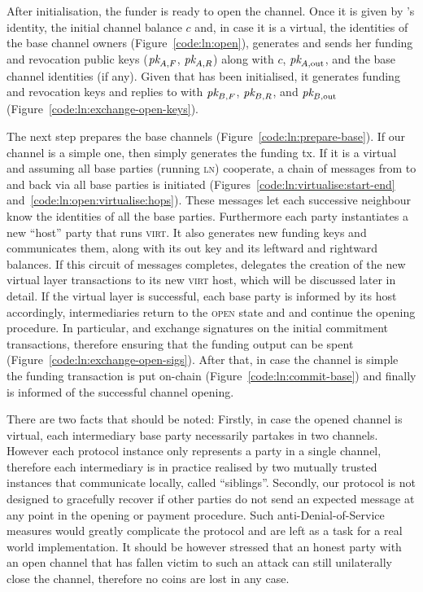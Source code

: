   After initialisation, the funder \alice is ready to open the channel. Once it
  is given by \environment \bob's identity, the initial channel balance $c$ and,
  in case it is a virtual, the identities of the base channel owners
  (Figure~\ref{code:ln:open}), \alice generates and sends \bob her funding and
  revocation public keys ($\textit{pk}_{A, F}$, $\textit{pk}_{A, R}$) along with $c$, $\textit{pk}_{A,
  \mathrm{out}}$, and the base channel identities (if any). Given that \bob has
  been initialised, it generates funding and revocation keys and replies to
  \alice with $\textit{pk}_{B, F}$, $\textit{pk}_{B, R}$, and $\textit{pk}_{B, \mathrm{out}}$
  (Figure~\ref{code:ln:exchange-open-keys}).

  The next step prepares the base channels (Figure~\ref{code:ln:prepare-base}).
  If our channel is a simple one, then \alice simply generates the funding tx.
  If it is a virtual and assuming all base parties (running \textsc{ln})
  cooperate, a chain of messages from \alice to \bob and back via all base
  parties is initiated (Figures~\ref{code:ln:virtualise:start-end}
  and~\ref{code:ln:open:virtualise:hops}). These messages let each successive
  neighbour know the identities of all the base parties. Furthermore each party
  instantiates a new ``host'' party that runs \textsc{virt}. It also generates
  new funding keys and communicates them, along with its out key and its
  leftward and rightward balances. If this circuit of messages completes, \alice
  delegates the creation of the new virtual layer transactions to its new
  \textsc{virt} host, which will be discussed later in detail. If the virtual
  layer is successful, each base party is informed by its host accordingly,
  intermediaries return to the \textsc{open} state and \alice and \bob continue
  the opening procedure. In particular, \alice and \bob exchange signatures on
  the initial commitment transactions, therefore ensuring that the funding
  output can be spent (Figure~\ref{code:ln:exchange-open-sigs}). After that, in
  case the channel is simple the funding transaction is put on-chain
  (Figure~\ref{code:ln:commit-base}) and finally \environment is informed of the
  successful channel opening.

  There are two facts that should be noted: Firstly, in case the opened channel
  is virtual, each intermediary base party necessarily partakes in two channels.
  However each protocol instance only represents a party in a single channel,
  therefore each intermediary is in practice realised by two mutually trusted
  \pchan instances that communicate locally, called ``siblings''. Secondly, our
  protocol is not designed to gracefully recover if other parties do not send an
  expected message at any point in the opening or payment procedure. Such
  anti-Denial-of-Service measures would greatly complicate the protocol and are
  left as a task for a real world implementation. It should be however stressed
  that an honest party with an open channel that has fallen victim to such an
  attack can still unilaterally close the channel, therefore no coins are lost
  in any case.

